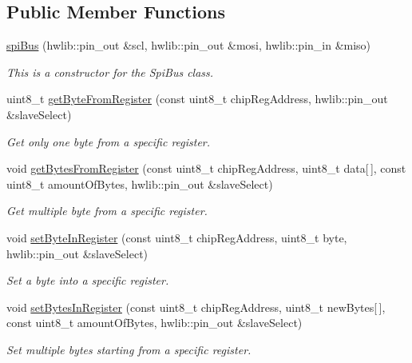 \subsection*{Public Member Functions}
\begin{DoxyCompactItemize}
\item 
\mbox{\hyperlink{classspi_bus_a042e32891d6fffd4b4eb706600244062}{spi\+Bus}} (hwlib\+::pin\+\_\+out \&scl, hwlib\+::pin\+\_\+out \&mosi, hwlib\+::pin\+\_\+in \&miso)
\begin{DoxyCompactList}\small\item\em This is a constructor for the Spi\+Bus class. \end{DoxyCompactList}\item 
uint8\+\_\+t \mbox{\hyperlink{classspi_bus_ab6b195b235dd0a1dad2f7cec3d997ffb}{get\+Byte\+From\+Register}} (const uint8\+\_\+t chip\+Reg\+Address, hwlib\+::pin\+\_\+out \&slave\+Select)
\begin{DoxyCompactList}\small\item\em Get only one byte from a specific register. \end{DoxyCompactList}\item 
void \mbox{\hyperlink{classspi_bus_a58318fdc7b4ff1869be4f0f321a853a8}{get\+Bytes\+From\+Register}} (const uint8\+\_\+t chip\+Reg\+Address, uint8\+\_\+t data\mbox{[}$\,$\mbox{]}, const uint8\+\_\+t amount\+Of\+Bytes, hwlib\+::pin\+\_\+out \&slave\+Select)
\begin{DoxyCompactList}\small\item\em Get multiple byte from a specific register. \end{DoxyCompactList}\item 
void \mbox{\hyperlink{classspi_bus_a3322a039f33a7180a9a57da662607b7d}{set\+Byte\+In\+Register}} (const uint8\+\_\+t chip\+Reg\+Address, uint8\+\_\+t byte, hwlib\+::pin\+\_\+out \&slave\+Select)
\begin{DoxyCompactList}\small\item\em Set a byte into a specific register. \end{DoxyCompactList}\item 
void \mbox{\hyperlink{classspi_bus_a734591a2184ce01cac6dcf875ac424d4}{set\+Bytes\+In\+Register}} (const uint8\+\_\+t chip\+Reg\+Address, uint8\+\_\+t new\+Bytes\mbox{[}$\,$\mbox{]}, const uint8\+\_\+t amount\+Of\+Bytes, hwlib\+::pin\+\_\+out \&slave\+Select)
\begin{DoxyCompactList}\small\item\em Set multiple bytes starting from a specific register. \end{DoxyCompactList}\end{DoxyCompactItemize}
